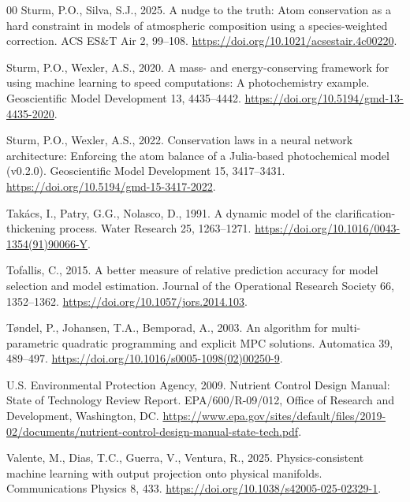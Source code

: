 \documentclass[a4paper,fleqn]{cas-sc}
\begin{document}
\begin{thebibliography}{00}
Sturm, P.O., Silva, S.J., 2025. A nudge to the truth: Atom conservation as a hard constraint in models of atmospheric composition using a species-weighted correction. ACS ES\&T Air 2, 99--108. \url{https://doi.org/10.1021/acsestair.4c00220}.

Sturm, P.O., Wexler, A.S., 2020. A mass- and energy-conserving framework for using machine learning to speed computations: A photochemistry example. Geoscientific Model Development 13, 4435--4442. \url{https://doi.org/10.5194/gmd-13-4435-2020}.

Sturm, P.O., Wexler, A.S., 2022. Conservation laws in a neural network architecture: Enforcing the atom balance of a Julia-based photochemical model (v0.2.0). Geoscientific Model Development 15, 3417--3431. \url{https://doi.org/10.5194/gmd-15-3417-2022}.

Tak\'acs, I., Patry, G.G., Nolasco, D., 1991. A dynamic model of the clarification-thickening process. Water Research 25, 1263--1271. \url{https://doi.org/10.1016/0043-1354(91)90066-Y}.

Tofallis, C., 2015. A better measure of relative prediction accuracy for model selection and model estimation. Journal of the Operational Research Society 66, 1352--1362. \url{https://doi.org/10.1057/jors.2014.103}.

T{\o}ndel, P., Johansen, T.A., Bemporad, A., 2003. An algorithm for multi-parametric quadratic programming and explicit MPC solutions. Automatica 39, 489--497. \url{https://doi.org/10.1016/s0005-1098(02)00250-9}.

U.S. Environmental Protection Agency, 2009. Nutrient Control Design Manual: State of Technology Review Report. EPA/600/R-09/012, Office of Research and Development, Washington, DC. \url{https://www.epa.gov/sites/default/files/2019-02/documents/nutrient-control-design-manual-state-tech.pdf}.

Valente, M., Dias, T.C., Guerra, V., Ventura, R., 2025. Physics-consistent machine learning with output projection onto physical manifolds. Communications Physics 8, 433. \url{https://doi.org/10.1038/s42005-025-02329-1}.


\end{thebibliography}
\end{document}
